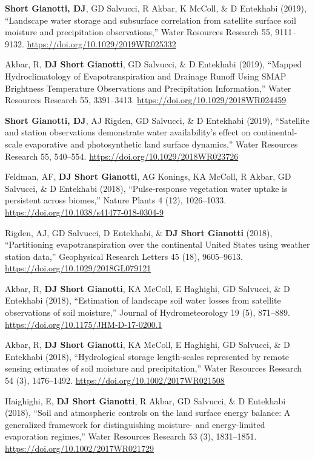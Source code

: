 \documentclass[10pt, a4paper]{article}
\newcommand{\lbr}{\vspace*{12pt}}
\newcommand{\years}[1]{\mbox{}\marginnote{\scriptsize #1}} %
\begin{document}
\years{2019c}\textbf{Short Gianotti, DJ}, GD Salvucci, R Akbar, K McColl, \& D Entekhabi (2019), ``Landscape water storage and subsurface correlation from satellite surface soil moisture and precipitation observations,'' Water Resources Research 55, 9111--9132. \url{https://doi.org/10.1029/2019WR025332} \lbr

\years{2019b}Akbar, R, \textbf{DJ Short Gianotti}, GD Salvucci, \& D Entekhabi (2019), ``Mapped Hydroclimatology of Evapotranspiration and Drainage Runoff Using SMAP Brightness Temperature Observations and Precipitation Information,'' Water Resources Research 55, 3391--3413. \url{https://doi.org/10.1029/2018WR024459}\lbr  

\years{2019a}\textbf{Short Gianotti, DJ}, AJ Rigden, GD Salvucci, \& D Entekhabi (2019), ``Satellite and station observations demonstrate water availability's effect on continental-scale evaporative and photosynthetic land surface dynamics,'' Water Resources Research 55, 540--554. \url{https://doi.org/10.1029/2018WR023726} \lbr

\years{2018e}Feldman, AF, \textbf{DJ Short Gianotti}, AG Konings, KA McColl, R Akbar, GD Salvucci, \& D Entekhabi (2018), ``Pulse-response vegetation water uptake is persistent across biomes,'' Nature Plants 4 (12), 1026--1033. \url{https://doi.org/10.1038/s41477-018-0304-9} \lbr

\years{2018d}Rigden, AJ, GD Salvucci, D Entekhabi, \& \textbf{DJ Short Gianotti} (2018), ``Partitioning evapotranspiration over the continental United States using weather station data,'' Geophysical Research Letters 45 (18), 9605--9613. \url{https://doi.org/10.1029/2018GL079121} \lbr

\years{2018c}Akbar, R, \textbf{DJ Short Gianotti}, KA McColl, E Haghighi, GD Salvucci, \& D Entekhabi (2018), ``Estimation of landscape soil water losses from satellite observations of soil moisture,'' Journal of Hydrometeorology 19 (5), 871--889. \url{https://doi.org/10.1175/JHM-D-17-0200.1} \lbr

\years{2018b}Akbar, R, \textbf{DJ Short Gianotti}, KA McColl, E Haghighi, GD Salvucci, \& D Entekhabi (2018), ``Hydrological storage length-scales represented by remote sensing estimates of soil moisture and precipitation,'' Water Resources Research 54 (3), 1476--1492. \url{ https://doi.org/10.1002/2017WR021508}\lbr

\years{2018a}Haighighi, E, \textbf{DJ Short Gianotti}, R Akbar, GD Salvucci, \& D Entekhabi (2018), ``Soil and atmospheric controls on the land surface energy balance: A generalized framework for distinguishing moisture- and energy-limited evaporation regimes,'' Water Resources Research 53 (3), 1831--1851. \url{https://doi.org/10.1002/2017WR021729} \lbr
\end{document}
